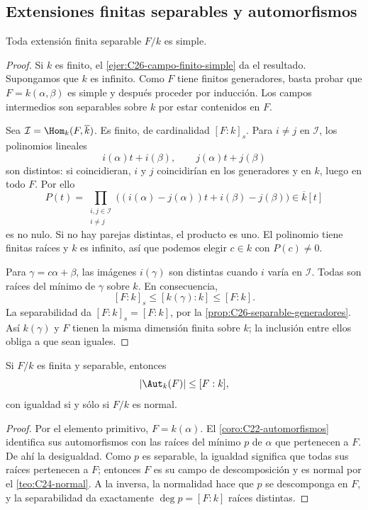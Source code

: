 \subsection{Extensiones finitas separables y automorfismos}
\begin{prop}\label{prop:C26-primitivo}
Toda extensión finita separable $F/k$ es simple.
\end{prop}
\begin{proof}
Si $k$ es finito, el \cref{ejer:C26-campo-finito-simple} da el resultado. Supongamos que $k$ es infinito. Como $F$ tiene finitos generadores, basta probar que $F=k(\alpha,\beta)$ es simple y después proceder por inducción. Los campos intermedios son separables sobre $k$ por estar contenidos en $F$.

Sea $\mathcal I=\Hom_k(F,\overline k)$. Es finito, de cardinalidad $[F:k]_s$. Para $i\ne j$ en $\mathcal I$, los polinomios lineales
\[
i(\alpha)t+i(\beta),\qquad j(\alpha)t+j(\beta)
\]
son distintos: si coincidieran, $i$ y $j$ coincidirían en los generadores y en $k$, luego en todo $F$. Por ello
\[
P(t)=\prod_{\substack{i,j\in\mathcal I\\i\ne j}}
\bigl((i(\alpha)-j(\alpha))t+i(\beta)-j(\beta)\bigr)
\in\overline k[t]
\]
es no nulo. Si no hay parejas distintas, el producto es uno. El polinomio tiene finitas raíces y $k$ es infinito, así que podemos elegir $c\in k$ con $P(c)\ne0$.

Para $\gamma=c\alpha+\beta$, las imágenes $i(\gamma)$ son distintas cuando $i$ varía en $\mathcal I$. Todas son raíces del mínimo de $\gamma$ sobre $k$. En consecuencia,
\[
[F:k]_s\leq[k(\gamma):k]\leq[F:k].
\]
La separabilidad da $[F:k]_s=[F:k]$, por la \cref{prop:C26-separable-generadores}. Así $k(\gamma)$ y $F$ tienen la misma dimensión finita sobre $k$; la inclusión entre ellos obliga a que sean iguales.
\end{proof}

\begin{coro}\label{coro:C26-aut-normal}
Si $F/k$ es finita y separable, entonces
\[
|\Aut_k(F)|\leq[F:k],
\]
con igualdad si y sólo si $F/k$ es normal.
\end{coro}
\begin{proof}
Por el elemento primitivo, $F=k(\alpha)$. El \cref{coro:C22-automorfismos} identifica sus automorfismos con las raíces del mínimo $p$ de $\alpha$ que pertenecen a $F$. De ahí la desigualdad. Como $p$ es separable, la igualdad significa que todas sus raíces pertenecen a $F$; entonces $F$ es su campo de descomposición y es normal por el \cref{teo:C24-normal}. A la inversa, la normalidad hace que $p$ se descomponga en $F$, y la separabilidad da exactamente $\deg p=[F:k]$ raíces distintas.
\end{proof}

